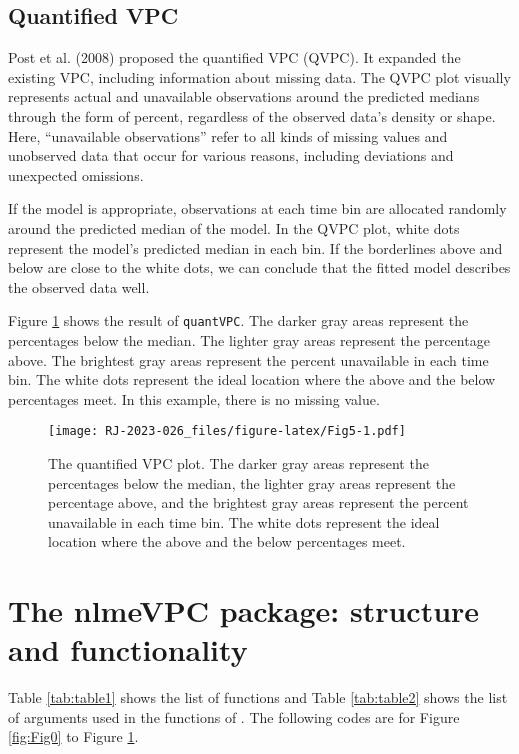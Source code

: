 \hypertarget{quantified-vpc}{%
\subsection{Quantified VPC}\label{quantified-vpc}}

Post et al. (2008) proposed the quantified VPC (QVPC). It expanded the existing VPC, including information about missing data.
The QVPC plot visually represents actual and unavailable observations around the predicted medians through the form of percent, regardless of the observed data's density or shape. Here, ``unavailable observations'' refer to all kinds of missing values and unobserved data that occur for various reasons, including deviations and unexpected omissions.

If the model is appropriate, observations at each time bin are allocated randomly around the predicted median of the model. In the QVPC plot, white dots represent the model's predicted median in each bin. If the borderlines above and below are close to the white dots, we can conclude that the fitted model describes the observed data well.

Figure \ref{fig:Fig5} shows the result of \texttt{quantVPC}. The darker gray areas represent the percentages below the median. The lighter gray areas represent the percentage above. The brightest gray areas represent the percent unavailable in each time bin. The white dots represent the ideal location where the above and the below percentages meet. In this example, there is no missing value.

\begin{figure}
\centering
\texttt{[image: RJ-2023-026\_files/figure-latex/Fig5-1.pdf]}
\caption{\label{fig:Fig5}The quantified VPC plot. The darker gray areas represent the percentages below the median, the lighter gray areas represent the percentage above, and the brightest gray areas represent the percent unavailable in each time bin. The white dots represent the ideal location where the above and the below percentages meet.}
\end{figure}

\hypertarget{the-nlmevpc-package-structure-and-functionality}{%
\section{The nlmeVPC package: structure and functionality}\label{the-nlmevpc-package-structure-and-functionality}}

Table \ref{tab:table1} shows the list of functions and Table \ref{tab:table2} shows the list of arguments used in the functions of . The following codes are for Figure \ref{fig:Fig0} to Figure \ref{fig:Fig5}.

